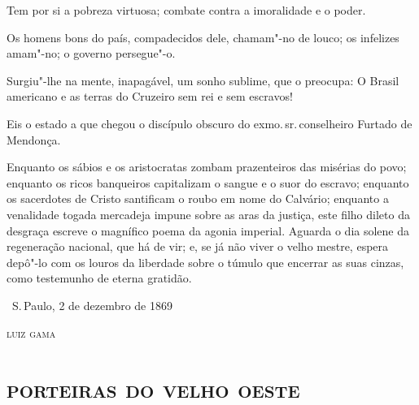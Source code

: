 Tem por si a pobreza virtuosa; combate contra a imoralidade e o poder.

Os homens bons do país, compadecidos dele, chamam"-no de louco; os
infelizes amam"-no; o governo persegue"-o.

Surgiu"-lhe na mente, inapagável, um sonho sublime, que o preocupa: O
Brasil americano e as terras do Cruzeiro sem rei e sem escravos!

Eis o estado a que chegou o discípulo obscuro do exmo.\,sr.\,conselheiro
Furtado de Mendonça.

Enquanto os sábios e os aristocratas zombam prazenteiros das misérias do
povo; enquanto os ricos banqueiros capitalizam o sangue e o suor do
escravo; enquanto os sacerdotes de Cristo santificam o roubo em nome do
Calvário; enquanto a
venalidade togada mercadeja impune sobre as aras da justiça, este filho
dileto da desgraça escreve o magnífico poema da agonia imperial. Aguarda
o dia solene da regeneração nacional, que há de vir; e, se já não viver
o velho mestre, espera depô"-lo com os louros da liberdade sobre o túmulo
que encerrar as suas cinzas, como testemunho de eterna gratidão.

\vfill

\hfill\ S.\,Paulo, 2 de dezembro de 1869\smallskip

\hfill\textsc{luiz gama}

\begingroup\makeatletter\@openrightfalse
\part{\textsc{porteiras do velho oeste}}

\pagebreak
\thispagestyle{empty}

